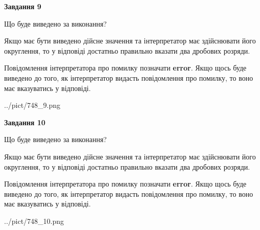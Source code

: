 \documentclass[12pt, ukrainian]{article}
\begin{document}
{\begin {Large}
{\begin {center}\textbf{Завдання 9}\end {center}}\par
Що буде виведено за виконання? \par

Якщо має бути виведено дійсне значення та інтерпретатор має здійснювати його округлення, 
то у відповіді достатньо правильно вказати два дробових розряди.

Повідомлення інтерпретатора про помилку позначати \textbf{error}.
Якщо щось буде виведено до того, як інтерпретатор видасть повідомлення про помилку, 
то воно має вказуватись у відповіді. \par

\begin{center}
	{../pict/748_9.png}
\end{center}
\newpage

{\begin {center}\textbf{Завдання 10}\end {center}}\par
Що буде виведено за виконання? \par

Якщо має бути виведено дійсне значення та інтерпретатор має здійснювати його округлення, 
то у відповіді достатньо правильно вказати два дробових розряди.

Повідомлення інтерпретатора про помилку позначати \textbf{error}.
Якщо щось буде виведено до того, як інтерпретатор видасть повідомлення про помилку, 
то воно має вказуватись у відповіді. \par

\begin{center}
	{../pict/748_10.png}
\end{center}
\newpage

\end {Large}}
\end{document}
